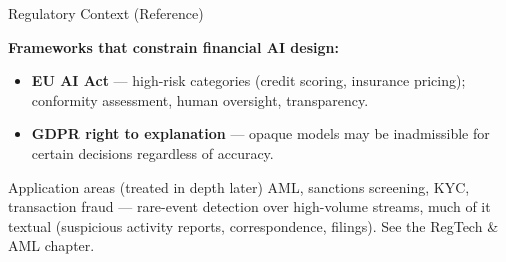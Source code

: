 \documentclass[9pt,t]{beamer}
\begin{document}
\begin{frame}[noframenumbering]{Regulatory Context (Reference)}

\textbf{Frameworks that constrain financial AI design:}
\begin{itemize}
  \item \textbf{EU AI Act} --- high-risk categories (credit scoring, insurance
        pricing); conformity assessment, human oversight, transparency.
  \item \textbf{GDPR right to explanation} --- opaque models may be inadmissible
        for certain decisions regardless of accuracy.
\end{itemize}

\medskip
\begin{block}{Application areas (treated in depth later)}
AML, sanctions screening, KYC, transaction fraud --- rare-event detection over
high-volume streams, much of it textual (suspicious activity reports,
correspondence, filings). See the RegTech \& AML chapter.
\end{block}
\end{frame}
\end{document}
